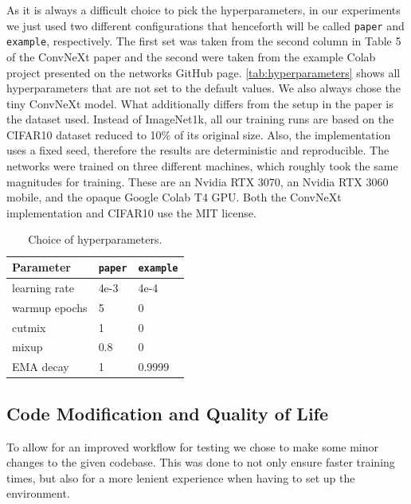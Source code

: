 \documentclass{article}
\begin{document}
As it is always a difficult choice to pick the hyperparameters, in our experiments we just used two different configurations that henceforth will be called \texttt{paper} and \texttt{example}, respectively.
The first set was taken from the second column in Table 5 of the ConvNeXt\cite{liu2022convnet} paper and the second were taken from the example Colab project presented on the networks GitHub page\cite{ayush0finetune}.
\autoref{tab:hyperparameters} shows all hyperparameters that are not set to the default values.
We also always chose the tiny ConvNeXt model.
What additionally differs from the setup in the paper is the dataset used.
Instead of ImageNet1k, all our training runs are based on the CIFAR10\cite{krizhevsky2009learning} dataset reduced to 10\% of its original size.
Also, the implementation uses a fixed seed, therefore the results are deterministic and reproducible.
The networks were trained on three different machines, which roughly took the same magnitudes for training.
These are an Nvidia RTX 3070, an Nvidia RTX 3060 mobile, and the opaque Google Colab T4 GPU\@.
Both the ConvNeXt implementation and CIFAR10 use the MIT license.
\begin{table}[h]
    \caption{Choice of hyperparameters.}
    \begin{center}
        \begin{tabular}{lll}
            \hline
            Parameter     & \texttt{paper} & \texttt{example} \\ \hline
            learning rate & 4e-3           & 4e-4             \\
            warmup epochs & 5              & 0                \\
            cutmix        & 1              & 0                \\
            mixup         & 0.8            & 0                \\
            EMA decay     & 1              & 0.9999
        \end{tabular}
    \end{center}
    \label{tab:hyperparameters}
\end{table}

\subsection{Code Modification and Quality of Life}\label{subsec:code-modification}
To allow for an improved workflow for testing we chose to make some minor changes to the given codebase.
This was done to not only ensure faster training times, but also for a more lenient experience when having to set up the environment.
\end{document}

